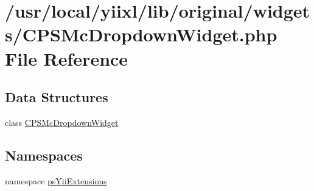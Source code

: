 \hypertarget{CPSMcDropdownWidget_8php}{
\section{/usr/local/yiixl/lib/original/widgets/CPSMcDropdownWidget.php File Reference}
\label{CPSMcDropdownWidget_8php}
}
\subsection*{Data Structures}
\begin{DoxyCompactItemize}
\item 
class \hyperlink{classCPSMcDropdownWidget}{CPSMcDropdownWidget}
\end{DoxyCompactItemize}
\subsection*{Namespaces}
\begin{DoxyCompactItemize}
\item 
namespace \hyperlink{namespacepsYiiExtensions}{psYiiExtensions}
\end{DoxyCompactItemize}
